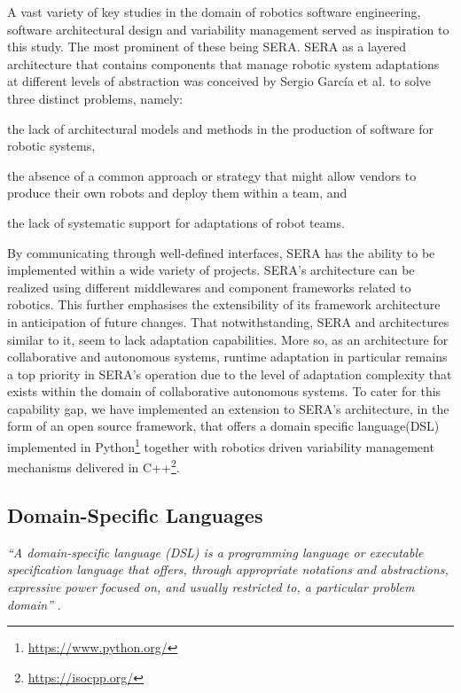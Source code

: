 \documentclass[conference]{IEEEtran}
\newcommand{\foot}[1]{\footnote{\url{#1}}}
\begin{document}
A vast variety of key studies in the domain of robotics software engineering, software architectural design and variability management served as inspiration to this study. The most prominent of these being SERA. SERA as a layered architecture that contains components that manage robotic system adaptations at different levels of abstraction was conceived by Sergio Garc\'{i}a et al. \cite{sera} to solve three distinct problems, namely:
\begin{enumerate*}[label=(\roman*)]
	\item the lack of architectural models and methods in the production of software for robotic systems,
	\item the absence of a common approach or strategy that might allow vendors to produce their own robots and deploy them within a team, and
	\item the lack of systematic support for adaptations of robot teams.
\end{enumerate*}

By communicating through well-defined interfaces, SERA has the ability to be implemented within a wide variety of projects. SERA's architecture can be realized using different middlewares and component frameworks related to robotics. This further emphasises the extensibility of its framework architecture in anticipation of future changes.
That notwithstanding, SERA and architectures similar to it, seem to lack adaptation capabilities. More so, as an architecture for collaborative and autonomous systems, runtime adaptation in particular remains a top priority in SERA's operation due to the level of adaptation complexity that exists within the domain of collaborative autonomous systems. To cater for this capability gap, we have implemented an extension to SERA's architecture, in the form of an open source framework, that offers a domain specific language(DSL) implemented in Python\foot{https://www.python.org/} together with robotics driven variability management mechanisms delivered in C++\foot{https://isocpp.org/}.

\subsection{Domain-Specific Languages}
\textit{``A domain-specific language (DSL) is a programming language or executable specification language that offers, through appropriate notations and abstractions, expressive power focused on, and usually restricted to, a particular problem domain''} \cite{dsl}.
\end{document}
